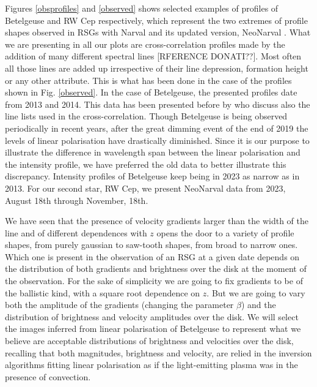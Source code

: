 \documentclass{/Users/art2/TeX/aanda/aa}
\begin{document}
Figures \ref{obsprofiles} and \ref{observed} shows selected examples of profiles of Betelgeuse and RW Cep respectively, which represent the two extremes of profile shapes 
observed in RSGs with Narval and its updated version, NeoNarval \cite[see][for a description of both instruments and the data reduction procedures]{lopez_ariste_three-dimensional_2022,Donati}.
What we are presenting in all our plots are cross-correlation profiles made by the addition of many different spectral lines  \citep{josselin_atmospheric_2007}[RFERENCE DONATI??]. Most 
often all those lines are added up irrespective of their line depression, formation height or any other 
attribute. This is what has been done in the case of the profiles shown in  Fig. \ref{observed}. In the case of Betelgeuse, the presented profiles date from 2013 and 2014. This data has been presented before by 
\cite{auriere_discovery_2016} who discuss also the line lists used in the cross-correlation. Though Betelgeuse is being observed periodically 
in recent years, after the great dimming event of the end of 2019 the levels of linear polarisation have drastically diminished. Since 
it is our purpose to illustrate the difference in wavelength span between the linear polarisation and the intensity profile, we have 
preferred the old data to better illustrate this discrepancy. Intensity profiles of Betelgeuse keep being in 2023 as narrow as in 2013. For our 
second star, RW Cep, we present NeoNarval data from 
2023, August 18th through November, 18th.  

We have seen that the presence of velocity gradients larger than the width of the line and of different dependences with $z$ opens the door to a 
variety of profile shapes, from purely gaussian to saw-tooth shapes, from broad to narrow ones. 
Which one is present in the observation 
of an RSG at a given date depends on the distribution of both gradients and brightness over the disk at the moment of the observation.
For the sake of simplicity we are going to fix gradients to be of the ballistic kind, with a square root dependence on $z$. But we are going 
to vary both the amplitude of the gradients (changing the parameter $\beta$) and the distribution of brightness and velocity amplitudes over 
the disk. We will select the images inferred from linear polarisation of Betelgeuse to represent what we believe are acceptable 
distributions of brightness and velocities over the disk, recalling that both magnitudes, brightness and velocity, are relied in the 
inversion algorithms fitting linear polarisation as if the light-emitting plasma was in the presence of convection. 
\end{document}
